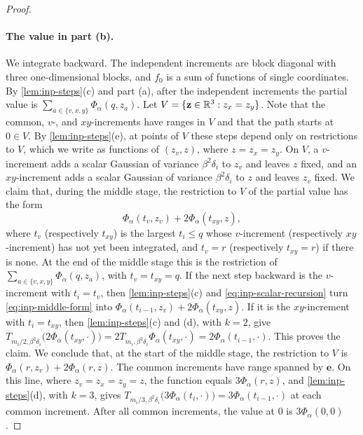 \begin{proof}
\paragraph{The value in part (b).} We integrate backward. The independent increments
are block diagonal with three one-dimensional blocks, and $f_0$ is a sum of
functions of single coordinates. By \cref{lem:inp-steps}(c) and part (a), after
the independent increments the partial value is $\sum_{a\in\{v,x,y\}}\Phi_\alpha(q,z_a)$.
Let $V=\{\mathbf z\in\mathbb R^3:z_x=z_y\}$. Note that the common, $v$-, and
$xy$-increments have ranges in $V$ and that the path starts at $0\in V$. By
\cref{lem:inp-steps}(e), at points of $V$ these steps depend only on
restrictions to $V$, which we write as
functions of $(z_v,z)$, where $z=z_x=z_y$. On $V$, a $v$-increment adds a scalar
Gaussian of variance $\beta^2\delta_i$ to $z_v$ and leaves $z$ fixed, and an
$xy$-increment adds a scalar Gaussian of variance $\beta^2\delta_i$ to $z$ and
leaves $z_v$ fixed. We claim that, during the middle stage, the restriction to
$V$ of the partial value has the form
\begin{equation}\label{eq:inp-middle-form}
 \Phi_\alpha(t_v,z_v)+2\Phi_\alpha(t_{xy},z),
\end{equation}
where $t_v$ (respectively $t_{xy}$) is the largest $t_i\le q$ whose $v$-increment
(respectively $xy$-increment) has not yet been integrated, and $t_v=r$
(respectively $t_{xy}=r$) if there is none. At the end of the middle stage this is
the restriction of $\sum_{a\in\{v,x,y\}}\Phi_\alpha(q,z_a)$, with $t_v=t_{xy}=q$. If the next step
backward is the $v$-increment with $t_i=t_v$, then \cref{lem:inp-steps}(c) and
\eqref{eq:inp-scalar-recursion} turn \eqref{eq:inp-middle-form} into
$\Phi_\alpha(t_{i-1},z_v)+2\Phi_\alpha(t_{xy},z)$. If it is the $xy$-increment with
$t_i=t_{xy}$, then \cref{lem:inp-steps}(c) and (d), with $k=2$, give
$T_{m_i/2,\beta^2\delta_i}\bigl(2\Phi_\alpha(t_{xy},\cdot)\bigr)=2T_{m_i,\beta^2\delta_i}\Phi_\alpha(t_{xy},\cdot)
=2\Phi_\alpha(t_{i-1},\cdot)$. This proves the claim. We conclude that, at the start
of the middle stage, the restriction to $V$ is
$\Phi_\alpha(r,z_v)+2\Phi_\alpha(r,z)$. The
common increments have range spanned by $\mathbf e$. On this line, where
$z_v=z_x=z_y=z$, the function equals $3\Phi_\alpha(r,z)$, and
\cref{lem:inp-steps}(d), with $k=3$, gives
$T_{m_i/3,\beta^2\delta_i}\bigl(3\Phi_\alpha(t_i,\cdot)\bigr)=3\Phi_\alpha(t_{i-1},\cdot)$ at each
common increment. After all common increments, the value at $0$ is
$3\Phi_\alpha(0,0)$.


\end{proof}
